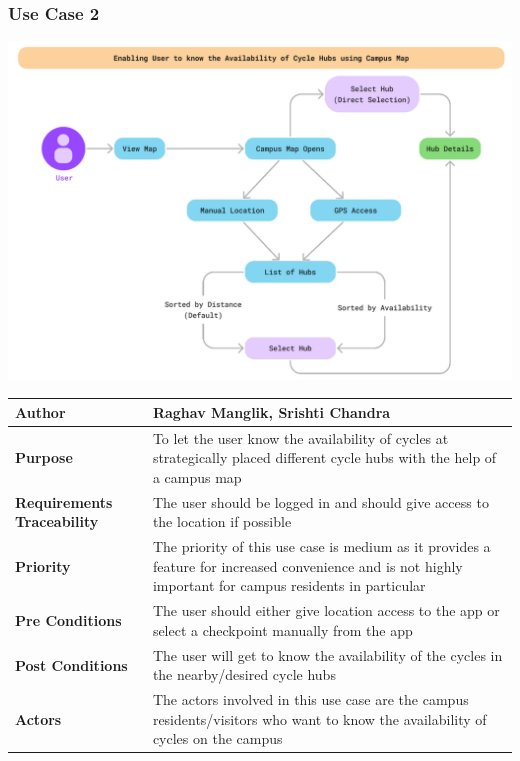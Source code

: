 \documentclass[11pt]{article}
\begin{document}
\subsubsection{Use Case 2}
\begin{center}
\includegraphics*[scale=0.6]{usecase-2.png}\\
\vspace{5mm}
\begin{tabular}{|l|p{10cm}|}
    \hline
    \textbf{Author} & Raghav Manglik, Srishti Chandra \\
    \hline
    \textbf{Purpose} & To let the user know the availability of cycles at strategically placed different cycle hubs with the help of a campus map \\
    \hline
    \textbf{Requirements Traceability} & The user should be logged in and should give access to  the location if possible\\
    \hline
    \textbf{Priority} & The priority of this use case is medium as it provides a feature for increased convenience and is not highly important for campus residents in particular\\
    \hline
    \textbf{Pre Conditions} &The user should either give location access to the app or select a checkpoint manually from the app \\
    \hline
    \textbf{Post Conditions} & The user will get to know the availability of the cycles in the   nearby/desired cycle hubs\\
    \hline
    \textbf{Actors} & The actors involved in this use case are the campus residents/visitors who want to know the availability of cycles on the campus\\
    \hline
\end{tabular}
\end{center}
\end{document}
